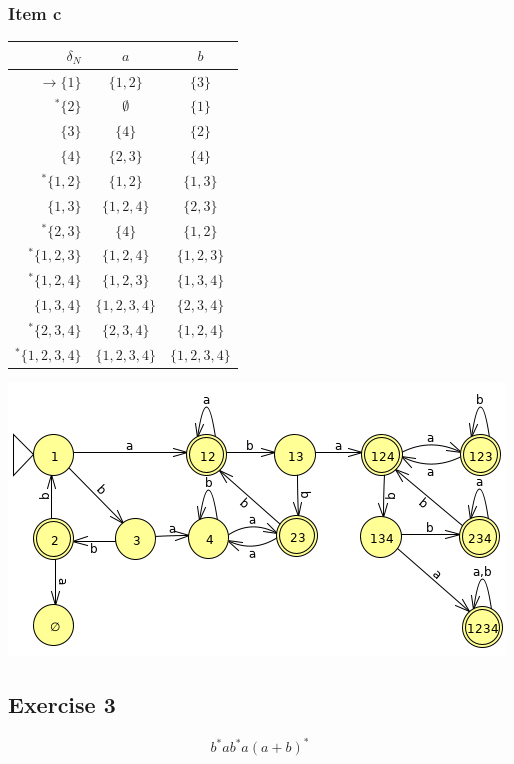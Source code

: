 {\subsubsection{Item c}
\begin{center} \begin{tabular}{r | c c}
	$\delta_N     $ & $a      $ & $b    $ \\ \hline
	$\rightarrow \{1    \}$ & $\{1,2  \}$ & $\{3    \}$\\
	$      ^* \{2    \}$ & $\emptyset$ & $\{1    \}$\\
	$            \{3    \}$ & $\{4    \}$ & $\{2    \}$\\
	$            \{4    \}$ & $\{2,3  \}$ & $\{4    \}$\\
	$      ^* \{1,2  \}$ & $\{1,2  \}$ & $\{1,3  \}$\\
	$            \{1,3  \}$ & $\{1,2,4\}$ & $\{2,3  \}$\\
	$      ^* \{2,3  \}$ & $\{4    \}$ & $\{1,2  \}$\\
	$      ^* \{1,2,3\}$ & $\{1,2,4\}$ & $\{1,2,3\}$\\
	$      ^* \{1,2,4\}$ & $\{1,2,3\}$ & $\{1,3,4\}$\\
	$            \{1,3,4\}$ & $\{1,2,3,4\}$ & $\{2,3,4\}$\\
	$      ^* \{2,3,4\}$ & $\{2,3,4\}$ & $\{1,2,4\}$\\
	$      ^* \{1,2,3,4\}$ & $\{1,2,3,4\}$ & $\{1,2,3,4\}$
\end{tabular} \end{center}
\begin{center} \includegraphics[scale=0.5]{TP06_2_d} \end{center}
\subsection{Exercise 3}
\begin{equation*}
	b^* a b^* a (a+b)^*
\end{equation*}
}
